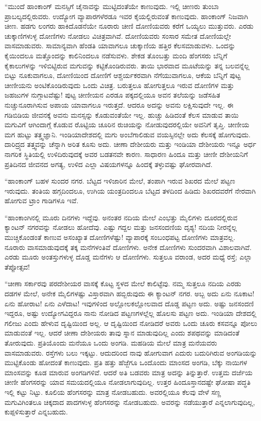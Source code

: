  “ಮುಂದೆ ಹಾಂಕಾಂಗ್ ಮನಸ್ಸಿಗೆ ಚೈನಾವನ್ನು ಮುಟ್ಟಿದಂತೆಯೇ ಕಾಣುವುದು. ಇಲ್ಲಿ ಚೀಣರು ತುಂಬಾ ಪ್ರಾಬಲ್ಯದಲ್ಲಿರುವರು. ಉದ್ಯೋಗ ವ್ಯಾಪಾರಗಳೆರಡೂ ಇವರ ಕೈಯಲ್ಲಿರುವಂತೆ ಕಾಣುವುದು. ಹಾಂಕಾಂಗ್ ನಿಜವಾಗಿ ಚೀಣ. ಹಡಗು ಲಂಗರು ಹಾಕಿದೊಡನೆಯೇ ನೂರಾರು ಚೀಣಿ ದೋಣಿಯವರು ಕರೆಗೆ ಒಯ್ಯಲು ಮುತ್ತುವರು. ಎರಡು ಚುಕ್ಕಾಣಿಗಳುಳ್ಳ ದೋಣಿಗಳು ನೋಡಲು ವಿಚಿತ್ರವಾಗಿವೆ. ದೋಣಿಯವರು ಸಂಸಾರ ಸಮೇತ ದೋಣಿಯಲ್ಲೇ ವಾಸಮಾಡುವರು. ಸಾಮಾನ್ಯವಾಗಿ ಹೆಂಡತಿ ಯಾವಾಗಲೂ ಚುಕ್ಕಾಣಿಯ ಹತ್ತಿರ ಕೆಲಸಮಾಡುವಳು. ಒಂದನ್ನು ಕೈಯಿಂದಲೂ ಮತ್ತೊಂದನ್ನು ಕಾಲಿನಿಂದಲೂ ನಡೆಸುವಳು. ಶೇಕಡ ತೊಂಬತ್ತು ಮಂದಿ ಹೆಂಗಸರು ಬೆನ್ನಿಗೆ ಕೈಕಾಲುಗಳನ್ನು ಇಳಿಬಿಟ್ಟಿರುವ ಮಗುವನ್ನು ಕಟ್ಟಿಕೊಂಡಿರುವರು. ತಾಯಿ ಭಾರವಾದ ಮೂಟೆಯನ್ನು ತನ್ನ ಬಲವನ್ನೆಲ್ಲ ಬಿಟ್ಟು ನೂಕುವಾಗಲೂ, ದೋಣಿಯಿಂದ ದೋಣಿಗೆ ಆಶ್ಚರ್ಯಕರವಾಗಿ ನೆಗೆಯುವಾಗಲೂ, ಆಕೆಯ ಬೆನ್ನಿಗೆ ಪುಟ್ಟ ಚೀಣೀಯನು ಅಂಟಿಕೊಂಡಿರುವುದು ಒಂದು ವಿಚಿತ್ರ. ಬರುತ್ತಲೂ ಹೋಗುತ್ತಲೂ ಇರುವ ದೋಣಿಗಳ ಮತ್ತು ಜಹಜುಗಳ ನುಗ್ಗಾಟವೆಷ್ಟು! ಪುಟ್ಟ ಚೀಣೀಯನ ಎರಡೂ ಪಕ್ಕದಲ್ಲಿಯೂ ಅವನ ತಲೆಯನ್ನು ಜಡೆಸಹಿತ ನುಚ್ಚುನೂರಾಗಿಸುವ ಅಪಾಯ ಯಾವಾಗಲೂ ಇರುತ್ತದೆ. ಆದರೂ ಅದನ್ನು ಅವನು ಲಕ್ಷಿಸುವುದೇ ಇಲ್ಲ. ಈ ಗಡಿಬಿಡಿಯ ಜೀವನಕ್ಕೆ ಅವನು ಮನಸ್ಸನ್ನು ಕೊಡುವಂತೆಯೇ ಇಲ್ಲ. ಹುಚ್ಚು ಹಿಡಿದಂತೆ ಕೆಲಸ ಮಾಡುವ ತಾಯಿ ಮಗುವಿಗೆ ಆಗಿಂದಾಗ್ಗೆ ಕೊಡುವ ರೊಟ್ಟಿಯ ಚೂರಿನ ರುಚಿಯನ್ನು ನೋಡುವುದರಲ್ಲಿಯೇ ಅವನಿಗೆ ತೃಪ್ತಿ. ಚೀಣೀಯ ಮಗ ಹುಟ್ಟು ತತ್ತ್ವಜ್ಞಾನಿ. ಇಂಡಿಯಾದೇಶದಲ್ಲಿ ಮಗು ಅಂಬೆಗಾಲಿಡುವ ವಯಸ್ಸಿನಲ್ಲೇ ಅದು ಕೆಲಸಕ್ಕೆ ಹೋಗುವುದು. ದಾರಿದ್ರ್ಯದ ತತ್ತ್ವವನ್ನು ಚೆನ್ನಾಗಿ ಅರಿತ ಕೂಸು ಅದು. ಚೀಣಾ ದೇಶೀಯರು ಮತ್ತು ಇಂಡಿಯಾ ದೇಶೀಯರು ಇನ್ನೂ ಅರ್ಧ ನಾಗರಿಕ ಸ್ಥಿತಿಯಲ್ಲಿ ಉಳಿದಿರುವುದಕ್ಕೆ ಅವರ ಬಡತನವೇ ಕಾರಣ. ಸಾಧಾರಣ ಹಿಂದೂ ಮತ್ತು ಚೀಣೀ ದೇಶೀಯನಿಗೆ ಪ್ರತಿದಿನದ ಜೀವನದ ಅಗತ್ಯ, ಉಳಿದ ಎಲ್ಲಾ ವಿಷಯಗಳನ್ನೂ ಹಿಂದಕ್ಕೆ ತಳ್ಳುವಷ್ಟು ಘೋರವಾಗಿದೆ.

\newpage

“ಹಾಂಕಾಂಗ್ ಬಹಳ ಸುಂದರ ನಗರ. ಬೆಟ್ಟದ ಇಳಿಜಾರಿನ ಮೇಲೆ, ತಂಪಾಗಿ ಇರುವ ಶಿಖರದ ಮೇಲೆ ಪಟ್ಟಣ ಇರುವುದು. ತಂತಿಯ ಹಗ್ಗದಿಂದಲೂ, ಉಗಿಯ ಯಂತ್ರದಿಂದಲೂ ಬೆಟ್ಟದ ತಳದಿಂದ ಹಿಡಿದು ಶಿಖರದವರೆಗೆ ನೇರವಾಗಿ ಹೋಗುವ ಟ್ರಾಂ ಗಾಡಿಗಳೂ ಇವೆ.

 “ಹಾಂಕಾಂಗಿನಲ್ಲಿ ಮೂರು ದಿನಗಳು ಇದ್ದೆವು. ಅನಂತರ ನದಿಯ ಮೇಲೆ ಎಂಭತ್ತು ಮೈಲಿಗಳು ದೂರದಲ್ಲಿರುವ ಕ್ಯಾಂಟನ್ ನಗರವನ್ನು ನೋಡಲು ಹೋದೆವು. ಎಷ್ಟು ಗದ್ದಲ ಮತ್ತು ಜನಸಂದಣಿಯ ದೃಶ್ಯ! ನದಿಯ ನೀರನ್ನೆಲ್ಲ ಮುಚ್ಚಿಕೊಂಡಂತೆ ಕಾಣುವ ಅಸಂಖ್ಯಾತ ದೋಣಿಗಳೆಷ್ಟು! ವ್ಯಾಪಾರಕ್ಕೆ ಸಂಬಂಧಪಟ್ಟ ದೋಣಿಗಳು ಮಾತ್ರವಲ್ಲ. ನೂರಾರು ವಾಸಮಾಡುವುದಕ್ಕೆ ತಕ್ಕ ಮನೆಗಳಂತಿವೆ ದೋಣಿಗಳು. ಅನೇಕ ದೋಣಿಗಳು ಸುಂದರವಾಗಿ ವಿಶಾಲವಾಗಿವೆ. ಎರಡು ಮೂರು ಅಂತಸ್ತುಗಳುಳ್ಳ ದೊಡ್ಡ ಮನೆಗಳು ಆ ದೋಣಿಗಳು. ಸುತ್ತಲೂ ವರಾಂಡ, ಅದರ ಮಧ್ಯೆ ರಸ್ತೆ; ಎಲ್ಲಾ ತೆಪ್ಪೋತ್ಸವ!

 “ಚೀಣಾ ಸರ್ಕಾರವು ಪರದೇಶೀಯರ ವಾಸಕ್ಕೆ ಕೊಟ್ಟ ಸ್ಥಳದ ಮೇಲೆ ಕಾಲಿಟ್ಟೆವು. ನಮ್ಮ ಸುತ್ತಲೂ ನದಿಯ ಎರಡು ದಡಗಳ ಮೇಲೆ, ಅನೇಕ ಮೈಲಿಗಳಷ್ಟು ವಿಸ್ತಾರವಾಗಿ ಹಬ್ಬಿರುವುದು ಈ ಕ್ಯಾಂಟನ್ ನಗರ. ಅಬ್ಬ ಅದು ಏನು ನೂಕಾಟ! ಏನು ಹೋರಾಟ! ಏನು ಎಳೆದಾಟ! ಇವುಗಳಿಂದ ಅಲ್ಲೋಲಕಲ್ಲೋಲವಾದ ದೊಡ್ಡ ಪಟ್ಟಣ ಅದು. ಅಷ್ಟು ಜನಸಂದಣಿ ಇದ್ದರೂ, ಅಷ್ಟು ಉದ್ಯೋಗವಿದ್ದರೂ ನಾನು ನೋಡಿದ ಪಟ್ಟಣಗಳಲ್ಲೆಲ್ಲ ಹೊಲಸು ಪಟ್ಟಣ ಅದು. ಇಂಡಿಯಾ ದೇಶದಲ್ಲಿ ಗಲೀಜು ಎಂದು ಹೇಳುವ ದೃಷ್ಟಿಯಿಂದ ಅಲ್ಲ. ಆ ದೃಷ್ಟಿಯಿಂದ ನೋಡಿದರೆ ಅವರು ಒಂದು ಚೂರು ಕಸವನ್ನೂ ಪೋಲು ಮಾಡುವಂತೆ ಇಲ್ಲ. ಆದರೆ ಚೀಣಾ ದೇಶೀಯರು ತಾವು ಸ್ನಾನ ಮಾಡುವುದಿಲ್ಲ ಎಂದು ಶಪಥವನ್ನು ಮಾಡಿದಂತೆ ತೋರುವುದು. ಪ್ರತಿಯೊಂದು ಮನೆಯೂ ಒಂದು ಅಂಗಡಿ. ಮಹಡಿಯ ಮೇಲೆ ಮಾತ್ರ ಮನೆಯವರು ವಾಸಮಾಡುವರು. ರಸ್ತೆಗಳು ಬಲು ಇಕ್ಕಟ್ಟು. ಆದುದರಿಂದ ನಾವು ಹೋಗುವಾಗ ಎದುರು ಬದುರಿಗಿರುವ ಅಂಗಡಿಯನ್ನು ಮುಟ್ಟಿಕೊಂಡು ಹೋದಂತೆ ಕಾಣುವುದು. ಪ್ರತಿ ಹತ್ತು ಹೆಜ್ಜೆಗೂ ಒಂದೊಂದು ಮಾಂಸದ ಅಂಗಡಿ, ಬೆಕ್ಕು ನಾಯಿಗಳ ಮಾಂಸವನ್ನು ಕೂಡ ಮಾರುವ ಅಂಗಡಿಗಳಿವೆ. ಆದರೆ ಅತಿ ಬಡವರು ಮಾತ್ರ ಅದನ್ನು ತಿನ್ನುತ್ತಾರೆ. ಉತ್ತಮ ದರ್ಜೆಯ ಚೀಣೀ ಹೆಂಗಸರನ್ನು ಯಾವ ಸಮಯದಲ್ಲಿಯೂ ನೋಡಲಾಗುವುದಿಲ್ಲ. ಉತ್ತರ ಹಿಂದೂಸ್ತಾನದಷ್ಟೇ ಘೋಷಾ ಪದ್ಧತಿ ಇಲ್ಲಿ ಕಟ್ಟು ನಿಟ್ಟು. ಕೂಲಿಯ ಹೆಂಗಸರನ್ನು ಮಾತ್ರ ನೋಡಬಹುದು. ಅವರಲ್ಲಿಯೂ ಕೆಲವು ವೇಳೆ ಸಣ್ಣ ಮಗುವಿಗಿಂತಲೂ ಚಿಕ್ಕದಾದ ಪಾದಗಳುಳ್ಳ ಹೆಂಗಸರನ್ನು ನೋಡಬಹುದು. ಅವರನ್ನು ನಡೆಯುತ್ತಾರೆ ಎನ್ನಲಾಗುವುದಿಲ್ಲ, ಕುಪ್ಪಳಿಸುತ್ತಾರೆ ಎನ್ನಬಹುದು.

